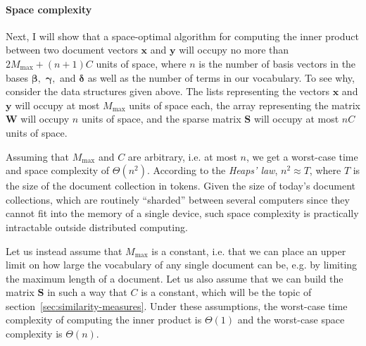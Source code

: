 \documentclass[
  digital, %
  notable, %
  lof,     %
  lot,     %
  nopalatino, color
]{fithesis3}
\let\term\emph
\let\emph=\textit
\begin{document}
\paragraph{Space complexity} Next, I will show that a space-optimal algorithm
for computing the inner product between two document vectors $\mathbf x$ and
$\mathbf y$ will occupy no more than $2M_{\max}+(n+1)C$ units of space, where
$n$ is
the number of basis vectors in the bases $\bm\beta,$
$\bm\gamma,$ and $\bm\delta$
as well as the number of terms in our vocabulary. To see why, consider the data
structures given above. The lists representing the vectors $\mathbf x$ and
$\mathbf y$ will occupy at most $M_{\max}$ units of space each, the array
representing the matrix $\mathbf W$ will occupy $n$ units of
space, and the sparse matrix $\mathbf S$ will occupy at most
$nC$ units of space.

Assuming that $M_{\max}$ and $C$ are arbitrary, i.e. at most $n$, we get a
worst-case time and space complexity of $\Theta(n^2)$. According to the
\term{Heaps' law}, $n^2\approx T$, where
$T$ is the size of the document collection in tokens. Given the
size of today's document collections, which are routinely ``sharded'' between
several computers since they cannot fit into the memory of a single device,
such space complexity is practically intractable outside distributed computing.

Let us instead assume that $M_{\max}$ is a constant, i.e. that we can
place an upper limit on how large the vocabulary of any single document can be,
e.g. by limiting the maximum length of a document. Let us also assume that we
can build the matrix $\mathbf S$ in such a way that $C$ is a constant, which
will be the topic of section~\ref{sec:similarity-measures}. Under these
assumptions, the worst-case time complexity of computing the inner product
is $\Theta(1)$ and the worst-case space complexity is $\Theta(n)$.
\end{document}
